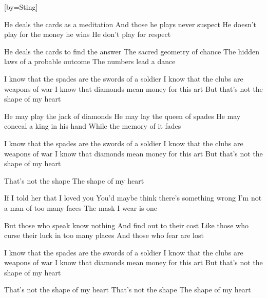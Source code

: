 [by={Sting}]

  \chordsoff

  \beginverse
  He deals the cards as a meditation
  And those he plays never suspect
  He doesn't play for the money he wins
  He don't play for respect
  \endverse

  \beginverse
  He deals the cards to find the answer
  The sacred geometry of chance
  The hidden laws of a probable outcome
  The numbers lead a dance
  \endverse

  \beginverse
  I know that the spades are the swords of a soldier
  I know that the clubs are weapons of war
  I know that diamonds mean money for this art
  But that's not the shape of my heart
  \endverse

  \beginverse
  He may play the jack of diamonds
  He may lay the queen of spades
  He may conceal a king in his hand
  While the memory of it fades
  \endverse

  \beginverse
  I know that the spades are the swords of a soldier
  I know that the clubs are weapons of war
  I know that diamonds mean money for this art
  But that's not the shape of my heart
  \endverse

  \beginverse
  That's not the shape
  The shape of my heart
  \endverse

  \beginverse
  If I told her that I loved you
  You'd maybe think there's something wrong
  I'm not a man of too many faces
  The mask I wear is one
  \endverse

  \beginverse
  But those who speak know nothing
  And find out to their cost
  Like those who curse their luck in too many places
  And those who fear are lost
  \endverse

  \beginverse
  I know that the spades are the swords of a soldier
  I know that the clubs are weapons of war
  I know that diamonds mean money for this art
  But that's not the shape of my heart
  \endverse

  \beginverse
  That's not the shape of my heart
  That's not the shape
  The shape of my heart
  \endverse
\endsong
